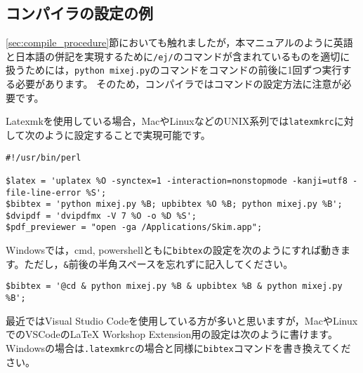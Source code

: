 \documentclass[10pt, a4paper, dvipdfmx, uplatex]{jsarticle} %
\begin{document}
\subsection{コンパイラの設定の例}
\label{sec:compile_config}

\ref{sec:compile_procedure}節においても触れましたが，本マニュアルのように英語と日本語の併記を実現するために\texttt{/ej/}のコマンドが含まれているものを適切に扱うためには，\texttt{python mixej.py}のコマンドを\BibTeX コマンドの前後に1回ずつ実行する必要があります。
そのため，コンパイラでは\BibTeX コマンドの設定方法に注意が必要です。

Latexmkを使用している場合，MacやLinuxなどのUNIX系列では\texttt{latexmkrc}に対して次のように設定することで実現可能です。

\noindent\makebox[\linewidth]{\rule{\linewidth}{0.4pt}}\vspace{-0.5zw}
\begin{lstlisting}[style=onecol]
#!/usr/bin/perl

$latex = 'uplatex %O -synctex=1 -interaction=nonstopmode -kanji=utf8 -file-line-error %S';
$bibtex = 'python mixej.py %B; upbibtex %O %B; python mixej.py %B';
$dvipdf = 'dvipdfmx -V 7 %O -o %D %S';
$pdf_previewer = "open -ga /Applications/Skim.app";
\end{lstlisting}\vspace{-1.8zw}
\noindent\makebox[\linewidth]{\rule{\linewidth}{0.4pt}}\vspace{0.5zw}\par

\noindent
Windowsでは，cmd, powershellともに\texttt{bibtex}の設定を次のようにすれば動きます。ただし，\texttt{\&}前後の半角スペースを忘れずに記入してください。

\noindent\makebox[\linewidth]{\rule{\linewidth}{0.4pt}}\vspace{-0.5zw}
\begin{lstlisting}[style=onecol]
$bibtex = '@cd & python mixej.py %B & upbibtex %B & python mixej.py %B';
\end{lstlisting}\vspace{-1.8zw}
\noindent\makebox[\linewidth]{\rule{\linewidth}{0.4pt}}\vspace{0.5zw}\par


最近ではVisual Studio Codeを使用している方が多いと思いますが，MacやLinuxでのVSCodeのLaTeX Workshop Extension用の設定は次のように書けます。Windowsの場合は\texttt{.latexmkrc}の場合と同様に\texttt{bibtex}コマンドを書き換えてください。
\end{document}
